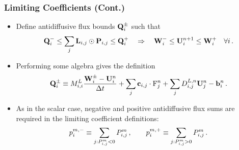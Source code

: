 \documentclass{beamer} \useoutertheme{infolines}
\begin{document}
\begin{frame}
\frametitle{Limiting Coefficients (Cont.)}

\begin{itemize}
  \item Define antidiffusive flux bounds $\mathbf{Q}_i^\pm$ such that
    \begin{equation}
      \mathbf{\limitedfluxbound}^-_i \leq
        \sum\limits_j \limitermatrix\ij\odot\correctionfluxmatrix\ij \leq
        \mathbf{\limitedfluxbound}^+_i
      \quad\Rightarrow\quad
      \mathbf{\DMPbound}_i^- \leq
        \solutionvector_i^{n+1} \leq
        \mathbf{\DMPbound}_i^+ \quad \forall i \eqp
    \end{equation}
  \item Performing some algebra gives the definition
    \begin{equation}
      \mathbf{\limitedfluxbound}_i^\pm \equiv
        \lumpedmassentry\frac{\mathbf{\DMPbound}_i^\pm-\solutionvector_i^n}{\dt}
        + \sum_j\gradiententry\cdot\consfluxinterpolant_j^n
        + \sum_j\diffusionmatrixletter\ij^{L,n}\solutionvector_j^n
        - \ssrhs_i^n \eqp
    \end{equation}
  \item As in the scalar case, negative and positive antidiffusive flux
    sums are required in the limiting coefficient definitions:
    \begin{equation}
      \correctionfluxletter_i^{\componentindex,-} \equiv
        \sum\limits_{j:\correctionfluxij^\componentindex<0}
        \correctionfluxij^\componentindex \eqc \qquad
      \correctionfluxletter_i^{\componentindex,+} \equiv
        \sum\limits_{j:\correctionfluxij^\componentindex>0}
        \correctionfluxij^\componentindex \eqp
    \end{equation}
\end{itemize}

\end{frame}
\end{document}
